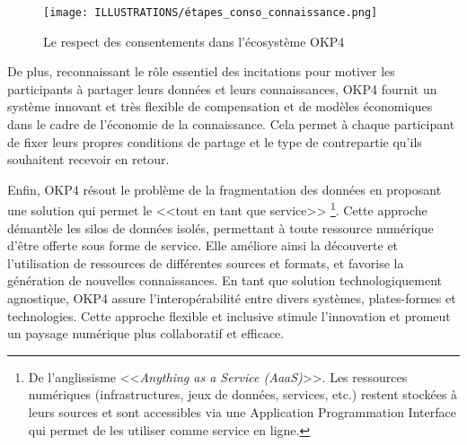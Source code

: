 \begin{figure}[h]
    \centering
    \texttt{[image: ILLUSTRATIONS/étapes\_conso\_connaissance.png]}
    \caption{Le respect des consentements dans l'écosystème OKP4}
    \label{fig:respect_consentement}
\end{figure}

De plus, reconnaissant le rôle essentiel des incitations pour motiver les participants à partager leurs données et leurs connaissances, OKP4 fournit un système innovant et très flexible de compensation et de modèles économiques dans le cadre de l'économie de la connaissance. Cela permet à chaque participant de fixer leurs propres conditions de partage et le type de contrepartie qu'ils souhaitent recevoir en retour.

Enfin, OKP4 résout le problème de la fragmentation des données en proposant une solution qui permet le <<tout en tant que service>> \footnote{De l'anglissisme <<\textit{Anything as a Service (AaaS)}>>. Les ressources numériques (infrastructures, jeux de données, services, etc.) restent stockées à leurs sources et sont accessibles via une Application Programmation Interface qui permet de les utiliser comme service en ligne.}. Cette approche démantèle les silos de données isolés, permettant à toute ressource numérique d'être offerte sous forme de service. Elle améliore ainsi la découverte et l'utilisation de ressources de différentes sources et formats, et favorise la génération de nouvelles connaissances. En tant que solution technologiquement agnostique, OKP4 assure l'interopérabilité entre divers systèmes, plates-formes et technologies. Cette approche flexible et inclusive stimule l'innovation et promeut un paysage numérique plus collaboratif et efficace.


